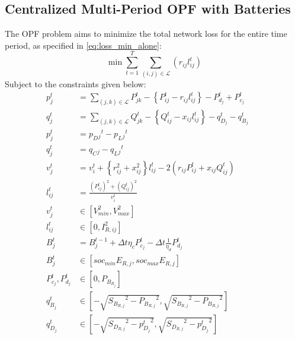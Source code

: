 \documentclass[../../outputs/main.tex]{subfiles}
\begin{document}
\subsection{Centralized Multi-Period OPF with Batteries}
The OPF problem aims to minimize the total network loss for the entire time period, as specified in \cref{eq:loss_min_alone}:
\begin{equation}
    \min {\sum_{t = 1}^{T} \sum_{(i, j) \in \mathcal{L}} (r_{ij}l_{ij}^t)} \label{eq:loss_min_alone}
\end{equation}
Subject to the constraints  given below:
\begin{align}
    {p_j^t} & = {\sum_{(j, k) \in \mathcal{L}} P_{jk}^t - \left\{P_{ij}^t - r_{ij}l_{ij}^t\right\} - P_{d_j}^t + P_{c_j}^t} && \label{eq:Pij} \\ 
    {q_j^t} & = {\sum_{(j, k) \in \mathcal{L}} Q_{jk}^t - \left\{Q_{ij}^t - x_{ij}l_{ij}^t\right\} - q_{D_j}^t - q_{B_j}^t} && \label{eq:Qij} \\ 
    {p_j^t} &= {p_D{_j}^t - p_L{_j}^t} \label{eq:pj}\\
    {q_j^t} &= {q_C{_j} -q_L{_j}^t} \label{eq:qj}\\
    {v_j^t} & = {v_{i}^t +  \left\{r_{ij}^2 + x_{ij}^2\right\}l_{ij}^t - 2(r_{ij}P_{ij}^t + x_{ij}Q_{ij}^t)} \label{eq:vj} && \\
    {l_{ij}^t} & = {\frac{(P_{ij}^{t})^2 + (Q_{ij}^{t})^2}{v_i^t}} \label{eq:lij} && \\
    { v^{t}_{j} } &\in { \left[ V^{2}_{min}, V^{2}_{max} \right]} \label{eq:lim_vj} && \\
    { l^{t}_{ij} } &\in { \left[ 0, I^{2}_{R, ij}
    \right] } \label{eq:lim_lij} && \\
    { B_{j}^{t} } &= {  B_{j}^{t-1} + \Delta t  \eta_c P_{c_j}^t - \Delta t\frac{1}{\eta_d} P_{d_j}^t } \label{eq:Bj} &&  \\
    { B^{t}_{j} } &\in { \left[ soc_{min}E_{R, j}, soc_{max}E_{R, j} \right] } \label{eq:lim_Bj} && \\
    { P^{t}_{c_{j}}, P^{t}_{d_{j}} }
    &\in
    { \left[ 0, P_{B_{R_{j}}} \right]} \label{eq:lim_PcPdj} && \\
    { q^{t}_{B_{j}} } 
    &\in 
    { \left[-\sqrt{ {S_{B_{R, j}}}^2 - {P_{B_{R, j}}}^2}, \sqrt{ {S_{B_{R, j}}}^2 - {P_{B_{R, j}}}^2}\right] } \label{eq:qBj} && \\
    { q^{t}_{D_{j}} } 
    &\in
    { \left[-\sqrt{ {S_{D_{R, j}}}^2 - {p^{t}_{D_{j}}}^2}, \sqrt{ {S_{D_{R, j}}}^2 - {p^{t}_{D_{j}}}^2}\right] } \label{eq:qDj} &&
\end{align}
\end{document}
